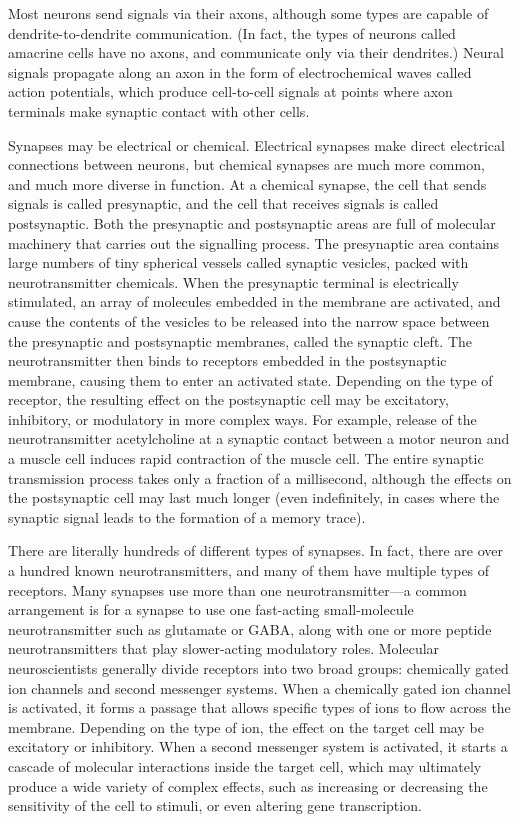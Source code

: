 \documentclass[]{book}
\begin{document}
Most neurons send signals via their axons, although some types are capable of dendrite-to-dendrite communication. (In fact, the types of neurons called amacrine cells have no axons, and communicate only via their dendrites.) Neural signals propagate along an axon in the form of electrochemical waves called action potentials, which produce cell-to-cell signals at points where axon terminals make synaptic contact with other cells.

Synapses may be electrical or chemical. Electrical synapses make direct electrical connections between neurons, but chemical synapses are much more common, and much more diverse in function. At a chemical synapse, the cell that sends signals is called presynaptic, and the cell that receives signals is called postsynaptic. Both the presynaptic and postsynaptic areas are full of molecular machinery that carries out the signalling process. The presynaptic area contains large numbers of tiny spherical vessels called synaptic vesicles, packed with neurotransmitter chemicals. When the presynaptic terminal is electrically stimulated, an array of molecules embedded in the membrane are activated, and cause the contents of the vesicles to be released into the narrow space between the presynaptic and postsynaptic membranes, called the synaptic cleft. The neurotransmitter then binds to receptors embedded in the postsynaptic membrane, causing them to enter an activated state. Depending on the type of receptor, the resulting effect on the postsynaptic cell may be excitatory, inhibitory, or modulatory in more complex ways. For example, release of the neurotransmitter acetylcholine at a synaptic contact between a motor neuron and a muscle cell induces rapid contraction of the muscle cell. The entire synaptic transmission process takes only a fraction of a millisecond, although the effects on the postsynaptic cell may last much longer (even indefinitely, in cases where the synaptic signal leads to the formation of a memory trace).

There are literally hundreds of different types of synapses. In fact, there are over a hundred known neurotransmitters, and many of them have multiple types of receptors. Many synapses use more than one neurotransmitter---a common arrangement is for a synapse to use one fast-acting small-molecule neurotransmitter such as glutamate or GABA, along with one or more peptide neurotransmitters that play slower-acting modulatory roles. Molecular neuroscientists generally divide receptors into two broad groups: chemically gated ion channels and second messenger systems. When a chemically gated ion channel is activated, it forms a passage that allows specific types of ions to flow across the membrane. Depending on the type of ion, the effect on the target cell may be excitatory or inhibitory. When a second messenger system is activated, it starts a cascade of molecular interactions inside the target cell, which may ultimately produce a wide variety of complex effects, such as increasing or decreasing the sensitivity of the cell to stimuli, or even altering gene transcription.
\end{document}
